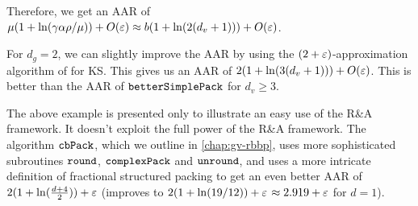 Therefore, we get an AAR of
$\mu(1+\ln(\gamma\alpha\rho/\mu)) + O(\varepsilon) \approx b(1+\ln(2(d_v+1))) + O(\varepsilon)$.

For $d_g = 2$, we can slightly improve the AAR by using the
$(2+\varepsilon)$-approximation algorithm of \cite{aco-gvks} for  KS.
This gives us an AAR of $2(1 + \ln(3(d_v+1))) + O(\varepsilon)$.
This is better than the AAR of $\operatorname{\mathtt{betterSimplePack}}$ for $d_v \ge 3$.

The above example is presented only to illustrate an easy use of the R\&A framework.
It doesn't exploit the full power of the R\&A framework.
The algorithm $\operatorname{\mathtt{cbPack}}$, which we outline in \cref{chap:gv-rbbp},
uses more sophisticated subroutines $\operatorname{\mathtt{round}}$, $\operatorname{\mathtt{complexPack}}$ and $\operatorname{\mathtt{unround}}$,
and uses a more intricate definition of fractional structured packing
to get an even better AAR of $2(1+\ln(\frac{d+4}{2})) + \varepsilon$
(improves to $2(1+\ln(19/12))+\varepsilon$ $\approx 2.919+\varepsilon$ for $d=1$).
